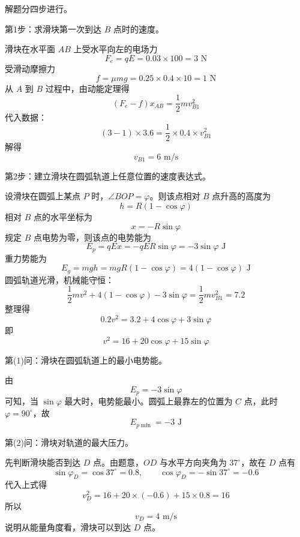 \documentclass[CJKmath,10pt,a4paper]{exam-zh}
\begin{document}
\begin{question}
\begin{center}
\end{center}

\begin{solution}
解题分四步进行。\par

第1步：求滑块第一次到达 $B$ 点时的速度。\par
滑块在水平面 $AB$ 上受水平向左的电场力
\[
F_e=qE=0.03\times 100=3\text{ N}
\]
受滑动摩擦力
\[
f=\mu mg=0.25\times 0.4\times 10=1\text{ N}
\]
从 $A$ 到 $B$ 过程中，由动能定理得
\[
(F_e-f)x_{AB}=\frac12 mv_{B1}^2
\]
代入数据：
\[
(3-1)\times 3.6=\frac12\times 0.4\times v_{B1}^2
\]
解得
\[
v_{B1}=6\text{ m/s}
\]

第2步：建立滑块在圆弧轨道上任意位置的速度表达式。\par
设滑块在圆弧上某点 $P$ 时，$\angle BOP=\varphi$。则该点相对 $B$ 点升高的高度为
\[
h=R(1-\cos\varphi)
\]
相对 $B$ 点的水平坐标为
\[
x=-R\sin\varphi
\]
规定 $B$ 点电势为零，则该点的电势能为
\[
E_p=qEx=-qER\sin\varphi=-3\sin\varphi\text{ J}
\]
重力势能为
\[
E_g=mgh=mgR(1-\cos\varphi)=4(1-\cos\varphi)\text{ J}
\]
圆弧轨道光滑，机械能守恒：
\[
\frac12 mv^2+4(1-\cos\varphi)-3\sin\varphi=\frac12 m v_{B1}^2=7.2
\]
整理得
\[
0.2v^2=3.2+4\cos\varphi+3\sin\varphi
\]
即
\[
v^2=16+20\cos\varphi+15\sin\varphi
\]

第(1)问：滑块在圆弧轨道上的最小电势能。\par
由
\[
E_p=-3\sin\varphi
\]
可知，当 $\sin\varphi$ 最大时，电势能最小。圆弧上最靠左的位置为 $C$ 点，此时 $\varphi=90^\circ$，故
\[
E_{p\min}=-3\text{ J}
\]

第(2)问：滑块对轨道的最大压力。\par
先判断滑块能否到达 $D$ 点。由题意，$OD$ 与水平方向夹角为 $37^\circ$，故在 $D$ 点有
\[
\sin\varphi_D=\cos37^\circ=0.8,\qquad \cos\varphi_D=-\sin37^\circ=-0.6
\]
代入上式得
\[
v_D^2=16+20\times(-0.6)+15\times 0.8=16
\]
所以
\[
v_D=4\text{ m/s}
\]
说明从能量角度看，滑块可以到达 $D$ 点。\par


\end{solution}
\end{question}
\end{document}
